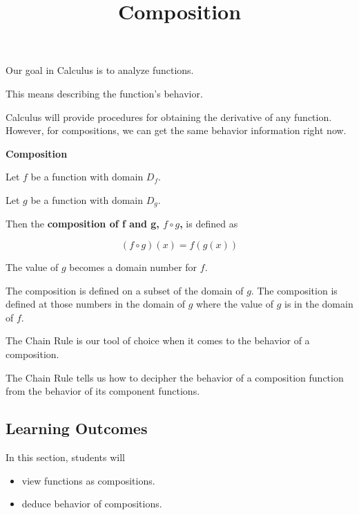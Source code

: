 \documentclass{ximera}
\title{Composition}
\begin{document}
\begin{abstract}
%
\end{abstract}
\maketitle








Our goal in Calculus is to analyze functions.


This means describing the function's behavior.

Calculus will provide procedures for obtaining the derivative of any function.  However, for compositions, we can get the same behavior information right now.






\begin{idea} \textbf{\textcolor{blue!55!black}{Composition}}  


Let $f$ be a function with domain $D_f$. 


Let $g$ be a function with domain $D_g$.




Then the \textbf{composition of f and g, $f \circ g$,} is defined as

\[
(f \circ g)(x) = f(g(x))
\] 


The value of $g$ becomes a domain number for $f$.


The composition is defined on a subset of the domain of $g$.  The composition is defined at those numbers in the domain of $g$ where the value of $g$ is in the domain of $f$.




\end{idea}


The Chain Rule is our tool of choice when it comes to the behavior of a composition.

The Chain Rule tells us how to decipher the behavior of a composition function from the behavior of its component functions.






\subsection*{Learning Outcomes}


\begin{sectionOutcomes}
In this section, students will 

\begin{itemize}
\item view functions as compositions.
\item deduce behavior of compositions.
\end{itemize}
\end{sectionOutcomes}
\end{document}

